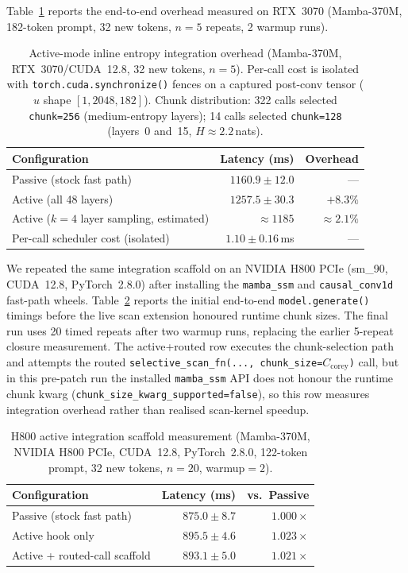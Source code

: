 Table~\ref{tab:active_integration} reports the end-to-end overhead measured on RTX~3070 (Mamba-370M, 182-token prompt, 32 new tokens, $n{=}5$ repeats, 2 warmup runs).

\begin{table}[!t]
\centering
\caption{Active-mode inline entropy integration overhead (Mamba-370M, RTX~3070/CUDA~12.8, 32 new tokens, $n{=}5$). Per-call cost is isolated with \texttt{torch.cuda.synchronize()} fences on a captured post-conv tensor ($u$ shape $[1,2048,182]$). Chunk distribution: 322 calls selected \texttt{chunk=256} (medium-entropy layers); 14 calls selected \texttt{chunk=128} (layers~0 and~15, $H{\approx}2.2$\,nats).}
\label{tab:active_integration}
\small
\begin{tabular}{lrr}
\toprule
Configuration & Latency (ms) & Overhead \\
\midrule
Passive (stock fast path) & $1160.9 \pm 12.0$ & --- \\
Active (all 48 layers) & $1257.5 \pm 30.3$ & $+8.3\%$ \\
Active ($k{=}4$ layer sampling, estimated) & ${\approx}1185$ & ${\approx}2.1\%$ \\
\midrule
Per-call scheduler cost (isolated) & $1.10 \pm 0.16$\,ms & --- \\
\bottomrule
\end{tabular}
\end{table}

We repeated the same integration scaffold on an NVIDIA H800 PCIe (sm\_90, CUDA~12.8, PyTorch~2.8.0) after installing the \texttt{mamba\_ssm} and \texttt{causal\_conv1d} fast-path wheels. Table~\ref{tab:h800_integrated} reports the initial end-to-end \texttt{model.generate()} timings before the live scan extension honoured runtime chunk sizes. The final run uses 20 timed repeats after two warmup runs, replacing the earlier 5-repeat closure measurement. The active+routed row executes the chunk-selection path and attempts the routed \texttt{selective\_scan\_fn(..., chunk\_size=$C_{\text{corey}}$)} call, but in this pre-patch run the installed \texttt{mamba\_ssm} API does not honour the runtime chunk kwarg (\texttt{chunk\_size\_kwarg\_supported=false}), so this row measures integration overhead rather than realised scan-kernel speedup.

\begin{table}[!t]
\centering
\caption{H800 active integration scaffold measurement (Mamba-370M, NVIDIA H800 PCIe, CUDA~12.8, PyTorch~2.8.0, 122-token prompt, 32 new tokens, $n{=}20$, warmup$=2$).}
\label{tab:h800_integrated}
\small
\begin{tabular}{lrr}
\toprule
Configuration & Latency (ms) & vs.\ Passive \\
\midrule
Passive (stock fast path) & $875.0 \pm 8.7$ & $1.000\times$ \\
Active hook only & $895.5 \pm 4.6$ & $1.023\times$ \\
Active + routed-call scaffold & $893.1 \pm 5.0$ & $1.021\times$ \\
\bottomrule
\end{tabular}
\end{table}


